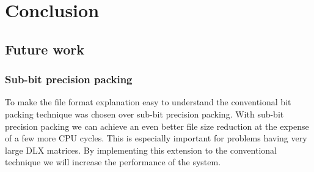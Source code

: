 
\chapter{Conclusion}
\label{conclusion}


\section{Future work}

\subsection*{Sub-bit precision packing}

To make the file format explanation easy to understand the conventional bit packing technique was chosen over sub-bit precision packing.
With sub-bit precision packing we can achieve an even better file size reduction at the expense of a few more CPU cycles.
This is especially important for problems having very large DLX matrices.
By implementing this extension to the conventional technique we will increase the performance of the system.


